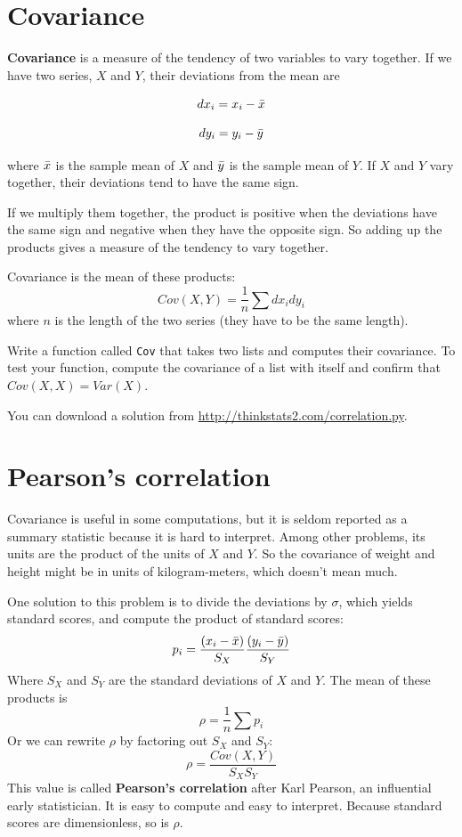 \documentclass[12pt]{book}
\begin{document}
\section{Covariance}

{\bf Covariance} is a measure of the tendency of two variables
to vary together.  If we have two series, $X$ and $Y$, their
deviations from the mean are

\[ dx_i = x_i - \bar{x} \]

\[ dy_i = y_i - \bar{y} \]

where $\bar{x}$ is the sample mean of $X$ and $\bar{y}$ is the sample mean
of $Y$.  If $X$ and $Y$ vary together, their deviations tend to have
the same sign.

If we multiply them together, the product is positive when the
deviations have the same sign and negative when they have the opposite
sign.  So adding up the products gives a measure of the tendency to
vary together.

Covariance is the mean of these products:
%
\[ Cov(X,Y) = \frac{1}{n} \sum dx_i dy_i \]
%
where $n$ is the length of the two series (they have to be the same
length).

\begin{exercise}
Write a function called {\tt Cov} that takes two lists
and computes their covariance.  To test your function, compute
the covariance of a list with itself and confirm that
$Cov(X, X) = Var(X)$.

You can download a solution from
\url{http://thinkstats2.com/correlation.py}.

\end{exercise}


\section{Pearson's correlation}

Covariance is useful in some computations, but
it is seldom reported as a summary statistic because it is hard to
interpret.  Among other problems, its units are the product of the
units of $X$ and $Y$.  So the covariance of weight and height might be
in units of kilogram-meters, which doesn't mean much.

One solution to this problem is to divide the deviations by $\sigma$,
which yields standard scores, and compute the product of standard scores:
%
\[ p_i = \frac{(x_i - \bar{x})}{S_X} \frac{(y_i - \bar{y})}{S_Y} \]
%
Where $S_X$ and $S_Y$ are the standard deviations of $X$ and $Y$.
The mean of these products is
%
\[ \rho = \frac{1}{n} \sum p_i \]
%
Or we can rewrite $\rho$ by factoring out $S_X$ and
$S_Y$:
%
\[ \rho = \frac{Cov(X,Y)}{S_X S_Y} \]
%
This value is called {\bf Pearson's correlation} after Karl Pearson,
an influential early statistician.  It is easy to compute and easy to
interpret.  Because standard scores are dimensionless, so is $\rho$.
\end{document}
